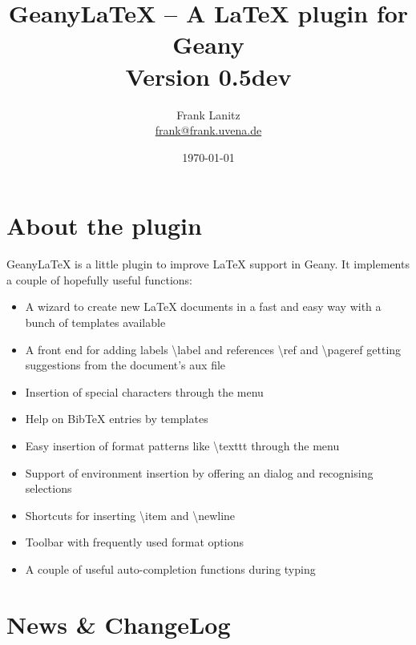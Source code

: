 \documentclass[%
paper=a4,%
fontsize=11pt,%
twoside=false,%
DIV18,
headsepline,
plainheadsepline,
footsepline,
plainfootsepline,
bibliography=totoc,%
listof=totoc,%
BCOR10mm,%
parskip=half,%
openany,%
]{scrartcl}
\title{Geany\LaTeX{} -- A \LaTeX{} plugin for Geany \\[1.5ex]
	   \normalsize Version 0.5dev}
\author{Frank Lanitz \\ \small{\href{mailto:frank@frank.uvena.de}{frank@frank.uvena.de}}}
\date{\today}
\begin{document}
\dedication{\normalsize \textbf{Note:} Please note that this document has been created on
\today. If you are using a devel version from SVN, please compile and check
\texttt{doc/geanylatex.tex} from sources. Please check Page \pageref
{sec:compiling_of_documentation}, Section \ref{sec:compiling_of_documentation} to see how to do this. }

\maketitle
\tableofcontents
\listoftables
\listoffigures
\newpage
{}
\section{About the plugin}

Geany\LaTeX{} is a little plugin to improve \LaTeX{} support in Geany.
It implements a couple of hopefully useful functions:

\begin{itemize}
	\item A wizard to create new \LaTeX{} documents in a fast and easy way
	 	  with a bunch of templates available
	\item A front end for adding labels \textbackslash label{} and
		  references \textbackslash ref{} and \textbackslash pageref{}
   		  getting suggestions from the document's aux file
	\item Insertion of special characters through the menu
	\item Help on BibTeX entries by templates
	\item Easy insertion of format patterns like \textbackslash texttt{}
		  through the menu
	\item Support of environment insertion by offering an dialog and
		  recognising selections
	\item Shortcuts for inserting \textbackslash item and
		  \textbackslash newline
	\item Toolbar with frequently used format options
	\item A couple of useful auto-completion functions during typing
\end{itemize}

\newpage
\section{News \& ChangeLog}
\end{document}
